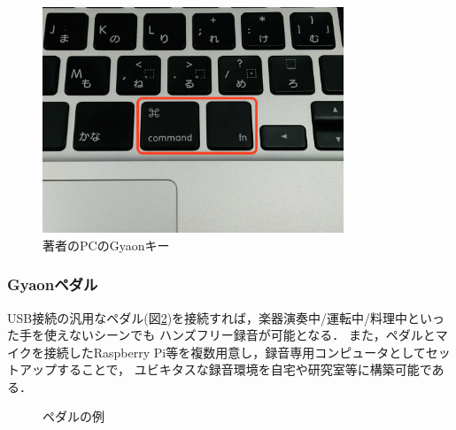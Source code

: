 \begin{figure}[H]
\centering
\includegraphics[width=9cm]{images/key.png}
\caption{著者のPCのGyaonキー}
\label{key}
\end{figure}

\subsubsection{Gyaonペダル}
USB接続の汎用なペダル(図\ref{pedal})を接続すれば，楽器演奏中/運転中/料理中といった手を使えないシーンでも
ハンズフリー録音が可能となる．
また，ペダルとマイクを接続したRaspberry Pi等を複数用意し，録音専用コンピュータとしてセットアップすることで，
ユビキタスな録音環境を自宅や研究室等に構築可能である．


\begin{figure}[H]
\centering
{}
\caption{ペダルの例}
\label{pedal}
\end{figure}


